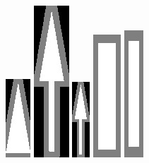 \documentclass{beamer}
\newcommand{\patternscale}{.3}
\newcommand{\patternspace}{1mm}
\begin{document}
\begin{frame}
\begin{center}
\begin{figure}[ht]
\includegraphics[scale = \patternscale]{patterns/3.jpg}\hspace*{\patternspace}
\includegraphics[scale = \patternscale]{patterns/4.jpg}\hspace*{\patternspace}
\includegraphics[scale = \patternscale]{patterns/5.jpg}\hspace*{\patternspace}
\includegraphics[scale = \patternscale]{patterns/6.jpg}\hspace*{\patternspace}
\includegraphics[scale = \patternscale]{patterns/7.jpg}
\end{figure}
\end{center}
\end{frame}
\end{document}
